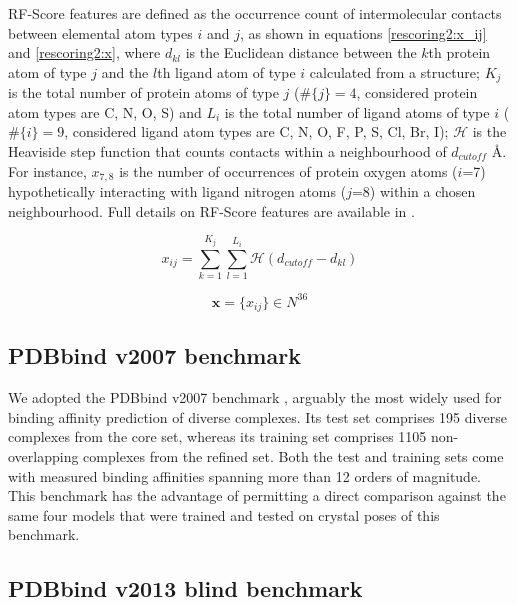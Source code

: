 \documentclass[twocolumn]{bmcart}
\begin{document}
RF-Score features are defined as the occurrence count of intermolecular contacts between elemental atom types $i$ and $j$, as shown in equations \ref{rescoring2:x_ij} and \ref{rescoring2:x}, where $d_{kl}$ is the Euclidean distance between the $k$th protein atom of type $j$ and the $l$th ligand atom of type $i$ calculated from a structure; $K_j$ is the total number of protein atoms of type $j$ ($\#\{j\}=4$, considered protein atom types are C, N, O, S) and $L_i$ is the total number of ligand atoms of type $i$ ($\#\{i\}=9$, considered ligand atom types are C, N, O, F, P, S, Cl, Br, I); $\mathcal{H}$ is the Heaviside step function that counts contacts within a neighbourhood of $d_{cutoff}$ \AA. For instance, $x_{7,8}$ is the number of occurrences of protein oxygen atoms ($i$=7) hypothetically interacting with ligand nitrogen atoms ($j$=8) within a chosen neighbourhood. Full details on RF-Score features are available in \cite{564,1295}.

\begin{equation}
\label{rescoring2:x_ij}
x_{ij}=\sum_{k=1}^{K_j}\sum_{l=1}^{L_i}\mathcal{H}(d_{cutoff}-d_{kl})
\end{equation}

\begin{equation}
\label{rescoring2:x}
\mathbf x=\{x_{ij}\}\in N^{36}
\end{equation}

\subsection*{PDBbind v2007 benchmark}

We adopted the PDBbind v2007 benchmark \cite{1313}, arguably the most widely used \cite{1647,1432} for binding affinity prediction of diverse complexes. Its test set comprises 195 diverse complexes from the core set, whereas its training set comprises 1105 non-overlapping complexes from the refined set. Both the test and training sets come with measured binding affinities spanning more than 12 orders of magnitude. This benchmark has the advantage of permitting a direct comparison against the same four models that were trained and tested on crystal poses \cite{1647} of this benchmark.

\subsection*{PDBbind v2013 blind benchmark}
\end{document}
